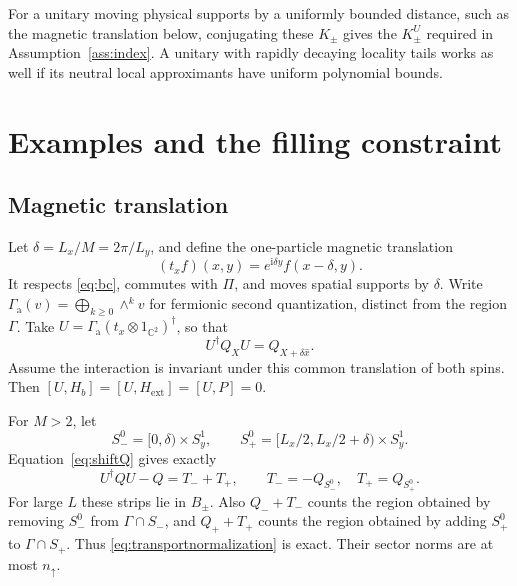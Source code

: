 \documentclass[11pt]{article}
\theoremstyle{definition}
\theoremstyle{remark}
\newcommand{\ii}{\mathrm i}
\newcommand{\up}{\uparrow}
\begin{document}
For a unitary moving physical supports by a uniformly bounded
distance, such as the magnetic translation below, conjugating
these \(K_\pm\) gives the \(K_\pm^U\) required in
Assumption~\ref{ass:index}.  A unitary with rapidly decaying
locality tails works as well if its neutral local approximants
have uniform polynomial bounds.

\section{Examples and the filling constraint}

\subsection{Magnetic translation}

Let \(\delta=L_x/M=2\pi/L_y\), and define the one-particle magnetic
translation
\[
 (t_xf)(x,y)=e^{\ii\delta y}f(x-\delta,y).
\]
It respects \eqref{eq:bc}, commutes with \(\Pi\), and moves
spatial supports by \(\delta\).  Write
\(\Gamma_{\mathrm a}(v)=\bigoplus_{k\ge0}\wedge^k v\) for
fermionic second quantization, distinct from the region \(\Gamma\).
Take
\(U=\Gamma_{\mathrm a}(t_x\otimes1_{\mathbb C^2})^\dagger\), so that
\begin{equation}\label{eq:shiftQ}
 U^\dagger Q_XU=Q_{X+\delta\hat x}.
\end{equation}
Assume the interaction is invariant under this common
translation of both spins.  Then
\([U,H_b]=[U,H_{\mathrm{ext}}]=[U,P]=0\).

For \(M>2\), let
\[
 S_-^0=[0,\delta)\times S_y^1,\qquad
 S_+^0=[L_x/2,L_x/2+\delta)\times S_y^1.
\]
Equation~\eqref{eq:shiftQ} gives exactly
\[
 U^\dagger QU-Q=T_-+T_+,\qquad
 T_-=-Q_{S_-^0},\quad T_+=Q_{S_+^0}.
\]
For large \(L\) these strips lie in \(B_\pm\).  Also
\(Q_-+T_-\) counts the region obtained by removing \(S_-^0\)
from \(\Gamma\cap S_-\), and \(Q_++T_+\) counts the region
obtained by adding \(S_+^0\) to \(\Gamma\cap S_+\).  Thus
\eqref{eq:transportnormalization} is exact.  Their sector
norms are at most \(n_\up\).
\end{document}
